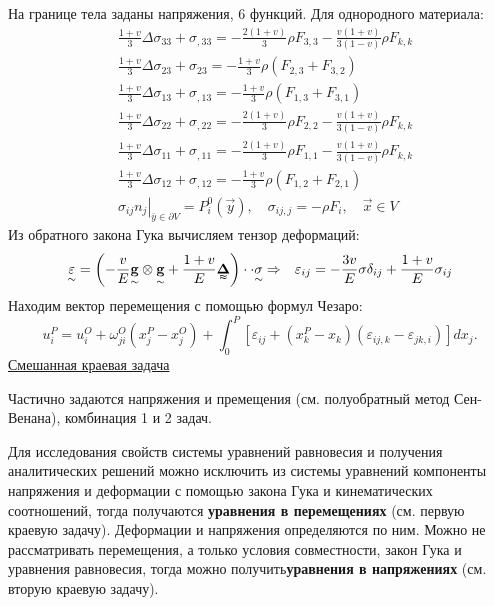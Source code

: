 На границе тела заданы напряжения, 6 функций. Для однородного материала:
$$
\begin{aligned}
& \frac{1+v}{3} \Delta \sigma_{33}+\sigma_{, 33}=-\frac{2(1+v)}{3} \rho F_{3,3}-\frac{v(1+v)}{3(1-v)} \rho F_{k, k} \\
& \frac{1+v}{3} \Delta \sigma_{23}+\sigma_{23}=-\frac{1+v}{3} \rho\left(F_{2,3}+F_{3,2}\right) \\
& \frac{1+v}{3} \Delta \sigma_{13}+\sigma_{, 13}=-\frac{1+v}{3} \rho\left(F_{1,3}+F_{3,1}\right) \\
& \frac{1+v}{3} \Delta \sigma_{22}+\sigma_{, 22}=-\frac{2(1+v)}{3} \rho F_{2,2}-\frac{v(1+v)}{3(1-v)} \rho F_{k, k} \\
& \frac{1+v}{3} \Delta \sigma_{11}+\sigma_{, 11}=-\frac{2(1+v)}{3} \rho F_{1,1}-\frac{v(1+v)}{3(1-v)} \rho F_{k, k} \\
& \frac{1+v}{3} \Delta \sigma_{12}+\sigma_{, 12}=-\frac{1+v}{3} \rho\left(F_{1,2}+F_{2,1}\right) \\
& \left.\sigma_{i j} n_j\right|_{\bar{y} \in \partial V}=P_i^0(\vec{y}), \quad \sigma_{i j, j}=-\rho F_i, \quad \vec{x} \in V 
\end{aligned}
$$
Из обратного закона Гука вычисляем тензор деформаций:
$$
\begin{aligned}
& \underset{\sim}{\varepsilon}=\left(-\frac{v}{E} \underset{\sim}{\mathbf{g}} \otimes \underset{\sim}{\mathbf{g}}+\frac{1+v}{E} \tenq{\Delta}\right) \cdot\cdot \underset{\sim}{\sigma}  \Rightarrow
& \varepsilon_{i j}=-\frac{3 v}{E} \sigma \delta_{i j}+\frac{1+v}{E} \sigma_{i j} 
\end{aligned}
$$
Находим вектор перемещения с помощью формул Чезаро:
$$
u_i^P=u_i^O+\omega_{j i}^O\left(x_j^P-x_j^O\right)+\int_0^P\left[\varepsilon_{i j}+\left(x_k^P-x_k\right)\left(\varepsilon_{i j, k}-\varepsilon_{j k, i}\right)\right] d x_j.
$$
\underline{Смешанная краевая задача}

Частично задаются напряжения и премещения (см. полуобратный метод Сен-Венана), комбинация 1 и 2 задач.


Для исследования свойств системы уравнений равновесия и получения аналитических решений можно исключить из системы уравнений компоненты напряжения и деформации с помощью закона Гука и кинематических соотношений, тогда получаются \textbf{уравнения в перемещениях} (см. первую краевую задачу). Деформации и напряжения определяются по ним. Можно не рассматривать перемещения, а только условия совместности, закон Гука и уравнения равновесия, тогда можно получить\textbf{уравнения в напряжениях} (см. вторую краевую задачу).


